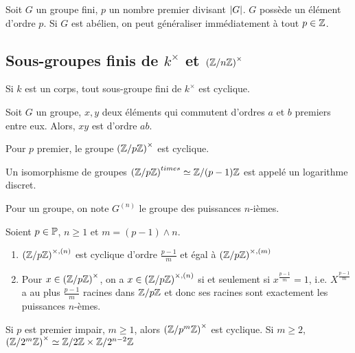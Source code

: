 \documentclass{cours}
\begin{document}
\begin{theorem}[Cauchy]
    Soit $G$ un groupe fini, $p$ un nombre premier divisant $\abs{G}$. $G$ possède un élément d'ordre $p$. Si $G$ est abélien, on peut généraliser immédiatement à tout $p \in \Z$.
\end{theorem}

\subsection{Sous-groupes finis de $k^{\times}$ et $\left(\Z/n\Z\right)^{\times}$}
\begin{theorem}
    Si $k$ est un corps, tout sous-groupe fini de $k^{\times}$ est cyclique.
\end{theorem}
\begin{lemma}[Cauchy]
    Soit $G$ un groupe, $x, y$ deux éléments qui commutent d'ordres $a$ et $b$ premiers entre eux. Alors, $xy$ est d'ordre $ab$. 
\end{lemma}
\begin{theorem}[Gauss]
    Pour $p$ premier, le groupe $\left(\Z/p\Z\right)^{\times}$ est cyclique.
\end{theorem}
\begin{definition}
    Un isomorphisme de groupes $\left(\Z/p\Z\right)^{times} \simeq \Z/(p-1)\Z$ est appelé un logarithme discret.
\end{definition}
\begin{definition}
    Pour un groupe, on note $G^{(n)}$ le groupe des puissances $n$-ièmes.
\end{definition}
\begin{proposition}
    Soient $p\in\P$, $n\geq 1$ et $m = (p-1)\wedge n$.
    \begin{enumerate}
        \item $\left(\Z/p\Z\right)^{\times, (n)}$ est cyclique d'ordre $\frac{p - 1}{m}$ et égal à $\left(\Z/p\Z\right)^{\times, (m)}$
        \item Pour $x \in \left(\znz{p}\right)^{\times}$, on a $x \in \left(\znz{p}\right)^{\times, (n)}$ si et seulement si $x^{\frac{p-1}{m}} = 1$, i.e. $X^{\frac{p-1}{m}}$ a au plus $\frac{p-1}{m}$ racines dans $\znz{p}$ et donc ses racines sont exactement les puissances $n$-èmes.
    \end{enumerate}
\end{proposition}

\begin{proposition}
    Si $p$ est premier impair, $m \geq 1$, alors $\left(\znz{p^{m}}\right)^{\times}$ est cyclique. Si $m\geq 2$, $\left(\znz{2^{m}}\right)^{\times} \simeq \znz{2} \times \znz{2^{n-2}}$
\end{proposition}
\end{document}
